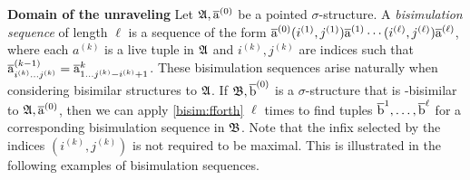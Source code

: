 \noindent \textbf{Domain of the unraveling}
Let ${\mathfrak{A}}, \overline{\mathrm{a}}^{(0)}$ be a pointed $\sigma$-structure.
A \emph{bisimulation sequence} of length $\ell$ is a sequence of the form $\overline{\mathrm{a}}^{(0)}(i^{(1)}, j^{(1)})\overline{\mathrm{a}}^{(1)}\cdots(i^{(\ell)}, j^{(\ell)})\overline{\mathrm{a}}^{(\ell)}$, where each $a^{(k)}$ is a live tuple in ${\mathfrak{A}}$ and $i^{(k)}, j^{(k)}$ are indices such that $\overline{\mathrm{a}}_{i^{(k)}\ldots j^{(k)}}^{(k-1)} = \overline{\mathrm{a}}_{1\ldots j^{(k)}-i^{(k)}+1}^{k}$.
These bisimulation sequences arise naturally when considering bisimilar structures to ${\mathfrak{A}}$.
If ${\mathfrak{B}}, \overline{\mathrm{b}}^{(0)}$ is a $\sigma$-structure that is \FGF-bisimilar to ${\mathfrak{A}}, \overline{\mathrm{a}}^{(0)}$, then we can apply \ref{bisim:fforth} $\ell$ times to find tuples $\overline{\mathrm{b}}^{1}, \ldots, \overline{\mathrm{b}}^{\ell}$ for a corresponding bisimulation sequence in ${\mathfrak{B}}$.
Note that the infix selected by the indices $(i^{(k)}, j^{(k)})$ is not required to be maximal.
This is illustrated in the following examples of bisimulation sequences.
